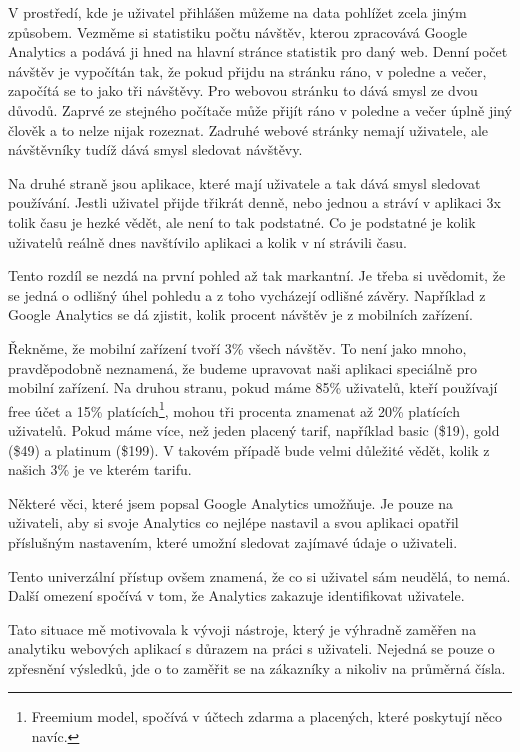 \documentclass[bc,male,java,dept456]{diploma}						%
\begin{document}
V prostředí, kde je uživatel přihlášen můžeme na data pohlížet zcela jiným způsobem. Vezměme si statistiku počtu návštěv, kterou zpracovává Google Analytics a podává ji hned na hlavní stránce statistik pro daný web. Denní počet návštěv je vypočítán tak, že pokud přijdu na stránku ráno, v poledne a večer, započítá se to jako tři návštěvy. Pro webovou stránku to dává smysl ze dvou důvodů. Zaprvé ze stejného počítače může přijít ráno v poledne a večer úplně jiný člověk a to nelze nijak rozeznat. Zadruhé webové stránky nemají uživatele, ale návštěvníky tudíž dává smysl sledovat návštěvy. 

Na druhé straně jsou aplikace, které mají uživatele a tak dává smysl sledovat po\-u\-ží\-vá\-ní. Jestli uživatel přijde třikrát denně, nebo jednou a stráví v aplikaci 3x tolik času je hezké vědět, ale není to tak podstatné. Co je podstatné je kolik uživatelů reálně dnes navštívilo aplikaci a kolik v ní strávili času.

Tento rozdíl se nezdá na první pohled až tak markantní. Je třeba si uvědomit, že se jedná o odlišný úhel pohledu a z toho vycházejí odlišné závěry. Například z Google Analytics se dá zjistit, kolik procent návštěv je z mobilních zařízení. 

Řekněme, že mobilní zařízení tvoří 3\% všech návštěv. To není jako mnoho, pra\-vdě\-po\-do\-bně neznamená, že budeme upravovat naši aplikaci speciálně pro mobilní zařízení. Na druhou stranu, pokud máme 85\% uživatelů, kteří používají free účet a 15\% platících\footnote{Freemium model, spočívá v účtech zdarma a placených, které poskytují něco navíc.}, mohou tři procenta znamenat až 20\% platících uživatelů. Pokud máme více, než jeden placený tarif, například basic (\$19), gold (\$49) a platinum (\$199). V takovém případě bude velmi důležité vědět, kolik z našich 3\% je ve kterém tarifu.

Některé věci, které jsem popsal Google Analytics umožňuje. Je pouze na uživateli, aby si svoje Analytics co nejlépe nastavil a svou aplikaci opatřil příslušným nastavením, které umožní sledovat zajímavé údaje o uživateli.

Tento univerzální přístup ovšem znamená, že co si uživatel sám neudělá, to nemá. Další omezení spočívá v tom, že Analytics zakazuje identifikovat uživatele.

Tato situace mě motivovala k vývoji nástroje, který je výhradně zaměřen na analytiku webových aplikací s důrazem na práci s uživateli. Nejedná se pouze o zpřesnění výsledků, jde o to zaměřit se na zákazníky a nikoliv na průměrná čísla.
\end{document}

